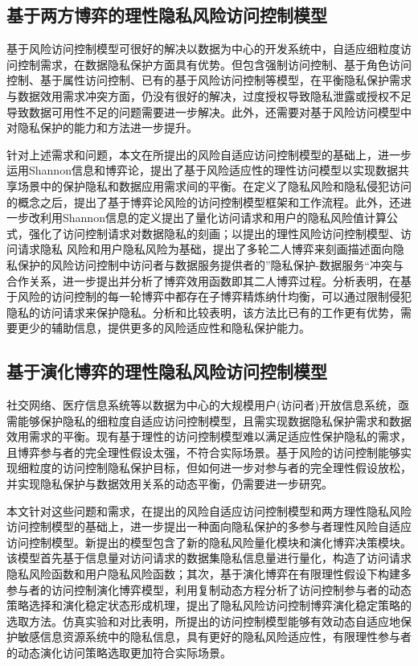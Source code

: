 \subsection{基于两方博弈的理性隐私风险访问控制模型}
基于风险访问控制模型可很好的解决以数据为中心的开发系统中，自适应细粒度访问控制需求，在数据隐私保护方面具有优势。但包含强制访问控制、基于角色访问控制、基于属性访问控制、已有的基于风险访问控制等模型，在平衡隐私保护需求与数据效用需求冲突方面，仍没有很好的解决，过度授权导致隐私泄露或授权不足导致数据可用性不足的问题需要进一步解决。此外，还需要对基于风险访问模型中对隐私保护的能力和方法进一步提升。

针对上述需求和问题，本文在所提出的风险自适应访问控制模型的基础上，进一步运用Shannon信息和博弈论，提出了基于风险适应性的理性访问模型以实现数据共享场景中的保护隐私和数据应用需求间的平衡。在定义了隐私风险和隐私侵犯访问的概念之后，提出了基于博弈论风险的访问控制模型框架和工作流程。此外，还进一步改利用Shannon信息的定义提出了量化访问请求和用户的隐私风险值计算公式，强化了访问控制请求对数据隐私的刻画；以提出的理性风险访问控制模型、访问请求隐私 风险和用户隐私风险为基础，提出了多轮二人博弈来刻画描述面向隐私保护的风险访问控制中访问者与数据服务提供者的”隐私保护-数据服务“冲突与合作关系，进一步提出并分析了博弈效用函数即其二人博弈过程。分析表明，在基于风险的访问控制的每一轮博弈中都存在子博弈精炼纳什均衡，可以通过限制侵犯隐私的访问请求来保护隐私。分析和比较表明，该方法比已有的工作更有优势，需要更少的辅助信息，提供更多的风险适应性和隐私保护能力。

\subsection{基于演化博弈的理性隐私风险访问控制模型}

社交网络、医疗信息系统等以数据为中心的大规模用户(访问者)开放信息系统，亟需能够保护隐私的细粒度自适应访问控制模型，且需实现数据隐私保护需求和数据效用需求的平衡。现有基于理性的访问控制模型难以满足适应性保护隐私的需求，且博弈参与者的完全理性假设太强，不符合实际场景。基于风险的访问控制能够实现细粒度的访问控制隐私保护目标，但如何进一步对参与者的完全理性假设放松，并实现隐私保护与数据效用关系的动态平衡，仍需要进一步研究。

本文针对这些问题和需求，在提出的风险自适应访问控制模型和两方理性隐私风险访问控制模型的基础上，进一步提出一种面向隐私保护的多参与者理性风险自适应访问控制模型。新提出的模型包含了新的隐私风险量化模块和演化博弈决策模块。该模型首先基于信息量对访问请求的数据集隐私信息量进行量化，构造了访问请求隐私风险函数和用户隐私风险函数；其次，基于演化博弈在有限理性假设下构建多参与者的访问控制演化博弈模型，利用复制动态方程分析了访问控制参与者的动态策略选择和演化稳定状态形成机理，提出了隐私风险访问控制博弈演化稳定策略的选取方法。仿真实验和对比表明，所提出的访问控制模型能够有效动态自适应地保护敏感信息资源系统中的隐私信息，具有更好的隐私风险适应性，有限理性参与者的动态演化访问策略选取更加符合实际场景。

